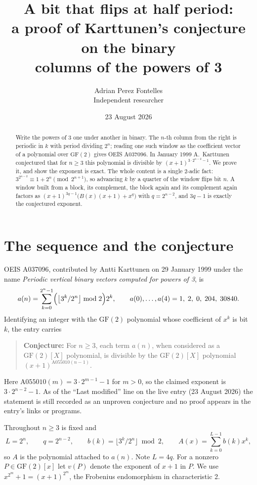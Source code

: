 \documentclass[11pt,a4paper]{article}
\title{A bit that flips at half period:\\
a proof of Karttunen's conjecture on the binary\\
columns of the powers of 3}
\author{Adrian Perez Fontelles\\ \small Independent researcher}
\date{23 August 2026}
\theoremstyle{plain}
\theoremstyle{definition}
\begin{document}
\maketitle

\begin{abstract}
Write the powers of 3 one under another in binary. The $n$-th column from the right is
periodic in $k$ with period dividing $2^{n}$; reading one such window as the coefficient
vector of a polynomial over $\mathrm{GF}(2)$ gives OEIS A037096. In January 1999
A.~Karttunen conjectured that for $n\ge3$ this polynomial is divisible by
$(x+1)^{3\cdot2^{n-2}-1}$. We prove it, and show the exponent is exact. The whole content
is a single 2-adic fact: $3^{2^{n-2}}\equiv1+2^{n}\pmod{2^{n+1}}$, so advancing $k$ by a
quarter of the window flips bit $n$. A window built from a block, its complement, the
block again and its complement again factors as
$(x+1)^{3q-1}\bigl(B(x)(x+1)+x^{q}\bigr)$ with $q=2^{n-2}$, and $3q-1$ is exactly the
conjectured exponent.
\end{abstract}

\section{The sequence and the conjecture}

OEIS A037096, contributed by Antti Karttunen on 29 January 1999 under the name
\emph{Periodic vertical binary vectors computed for powers of 3}, is
\[
  a(n)=\sum_{k=0}^{2^{n}-1}\Bigl(\bigl\lfloor 3^{k}/2^{n}\bigr\rfloor\bmod2\Bigr)2^{k},
  \qquad a(0),\dots,a(4)=1,\;2,\;0,\;204,\;30840.
\]
Identifying an integer with the $\mathrm{GF}(2)$ polynomial whose coefficient of $x^{k}$ is
bit $k$, the entry carries

\begin{quote}
\textbf{Conjecture:} For $n\ge3$, each term $a(n)$, when considered as a
$\mathrm{GF}(2)[X]$ polynomial, is divisible by the $\mathrm{GF}(2)[X]$ polynomial
$(x+1)^{\mathrm{A055010}(n-1)}$.
\end{quote}

Here $\mathrm{A055010}(m)=3\cdot2^{m-1}-1$ for $m>0$, so the claimed exponent is
$3\cdot2^{n-2}-1$. As of the ``Last modified'' line on the live entry (23 August 2026) the
statement is still recorded as an unproven conjecture and no proof appears in the entry's
links or programs.

Throughout $n\ge3$ is fixed and
\[
  L=2^{n},\qquad q=2^{n-2},\qquad b(k)=\bigl\lfloor3^{k}/2^{n}\bigr\rfloor\bmod2,
  \qquad A(x)=\sum_{k=0}^{L-1}b(k)x^{k},
\]
so $A$ is the polynomial attached to $a(n)$. Note $L=4q$. For a nonzero
$P\in\mathrm{GF}(2)[x]$ let $v(P)$ denote the exponent of $x+1$ in $P$. We use
$x^{2^{m}}+1=(x+1)^{2^{m}}$, the Frobenius endomorphism in characteristic 2.
\end{document}
